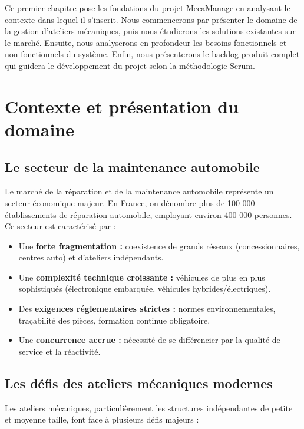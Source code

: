 Ce premier chapitre pose les fondations du projet MecaManage en analysant le contexte dans lequel il s'inscrit. Nous commencerons par présenter le domaine de la gestion d'ateliers mécaniques, puis nous étudierons les solutions existantes sur le marché. Ensuite, nous analyserons en profondeur les besoins fonctionnels et non-fonctionnels du système. Enfin, nous présenterons le backlog produit complet qui guidera le développement du projet selon la méthodologie Scrum.

\section{Contexte et présentation du domaine}

\subsection{Le secteur de la maintenance automobile}

Le marché de la réparation et de la maintenance automobile représente un secteur économique majeur. En France, on dénombre plus de 100 000 établissements de réparation automobile, employant environ 400 000 personnes. Ce secteur est caractérisé par :

\begin{itemize}
    \item Une \textbf{forte fragmentation :} coexistence de grands réseaux (concessionnaires, centres auto) et d'ateliers indépendants.
    
    \item Une \textbf{complexité technique croissante :} véhicules de plus en plus sophistiqués (électronique embarquée, véhicules hybrides/électriques).
    
    \item Des \textbf{exigences réglementaires strictes :} normes environnementales, traçabilité des pièces, formation continue obligatoire.
    
    \item Une \textbf{concurrence accrue :} nécessité de se différencier par la qualité de service et la réactivité.
\end{itemize}

\subsection{Les défis des ateliers mécaniques modernes}

Les ateliers mécaniques, particulièrement les structures indépendantes de petite et moyenne taille, font face à plusieurs défis majeurs :

